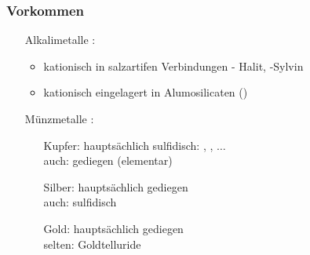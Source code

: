 \documentclass[a4paper, 12pt]{article}
\begin{document}
\subsubsection{Vorkommen}
\begin{itemize}
    \item[Alkalimetalle]:
    \begin{itemize}
        \item kationisch in salzartifen Verbindungen  - Halit,  -Sylvin
        \item kationisch eingelagert in Alumosilicaten ()
    \end{itemize}
    \item[Münzmetalle]:
    \begin{itemize}
        \item[Kupfer:] hauptsächlich sulfidisch: , , $\dots$\\auch: gediegen (elementar)
        \item[Silber:] hauptsächlich gediegen\\auch: sulfidisch
        \item[Gold:] hauptsächlich gediegen\\selten: Goldtelluride  
    \end{itemize}
\end{itemize}
\end{document}
